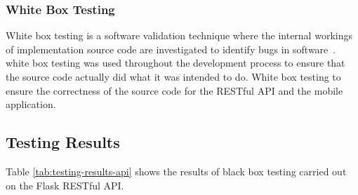 \documentclass[12pt, a4paper]{article}
\begin{document}
\subsubsection{White Box Testing}
White box testing is a software validation technique where the internal workings of implementation source code are investigated to identify bugs in software~\cite{nidhra2012black}. white box testing was used throughout the development process to ensure that the source code actually did what it was intended to do. White box testing to ensure the correctness of the source code for the RESTful API and the mobile application.
\subsection{Testing Results}
Table \ref{tab:testing-results-api} shows the results of black box testing carried out on the Flask RESTful API.
\end{document}
